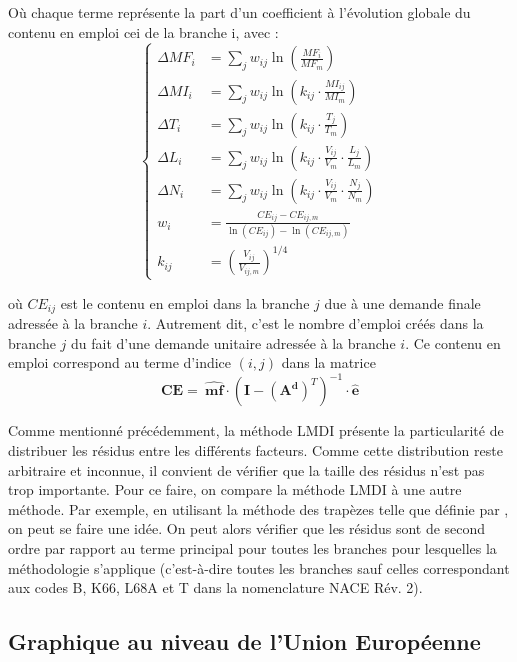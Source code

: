 Où chaque terme représente la part d’un coefficient à l’évolution globale du contenu en emploi cei de la branche i, avec :
\begin{equation}
\renewcommand*{\arraystretch}{2}
	\left\{
	\begin{array}{ll}
	\Delta MF_i &= \sum_j w_{ij} \ln(\frac{MF_i}{MF_m}) \\
	\Delta MI_i &= \sum_j w_{ij} \ln( k_{ij} \cdot \frac{MI_{ij}}{MI_m}) \\
	\Delta T_i &= \sum_j w_{ij} \ln( k_{ij} \cdot \frac{T_j}{T_m}) \\
	\Delta L_i &= \sum_j w_{ij} \ln( k_{ij} \cdot \frac{V_{ij}}{V_m} \cdot \frac{L_j}{L_m}) \\
	\Delta N_i &= \sum_j w_{ij} \ln( k_{ij} \cdot \frac{V_{ij}}{V_m} \cdot \frac{N_j}{N_m}) \\
	w_i &= \frac{CE_{ij} - CE_{ij,m}}{\ln(CE_{ij}) - \ln(CE_{ij,m})} \\
	k_{ij} &= \left(\frac{V_{ij}}{V_{ij,m}} \right)^{1/4}
	\end{array}
	\right.
\end{equation}


où $CE_{ij}$ est le contenu en emploi dans la branche $j$ due à une demande finale adressée à la branche $i$. Autrement dit, c'est le nombre d'emploi créés dans la branche $j$ du fait d'une demande unitaire adressée à la branche $i$. Ce contenu en emploi correspond au terme d'indice $(i,j)$ dans la matrice $$\pmb{CE} =~\widehat{\pmb{mf}} \cdot (\pmb{I} - (\pmb{A^d})^T)^{-1} \cdot \widehat{\pmb{e}}$$

Comme mentionné précédemment, la méthode LMDI présente la particularité de distribuer les résidus entre les différents facteurs. Comme cette distribution reste arbitraire et inconnue, il convient de vérifier que la taille des résidus n’est pas trop importante. Pour ce faire, on compare la méthode LMDI à une autre méthode. Par exemple, en utilisant la méthode des trapèzes telle que définie par \citet{Muller}, on peut se faire une idée. On peut alors vérifier que les résidus sont de second ordre par rapport au terme principal pour toutes les branches pour lesquelles la méthodologie s’applique (c’est-à-dire toutes les branches sauf celles correspondant aux codes B, K66, L68A et T dans la nomenclature NACE Rév. 2).


\cleardoublepage
\subsection{Graphique au niveau de l'Union Européenne}
\label{app:ges_emploi_EU}

